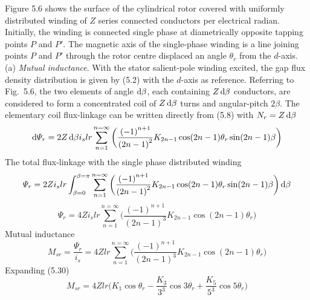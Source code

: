\documentclass[a4paper,numbers=noenddot,12pt]{scrbook}
\begin{document}
Figure 5.6 shows the surface of the cylindrical rotor covered with uniformly distributed winding of $Z$ series connected conductors per electrical radian. Initially, the winding is connected single phase at diametrically opposite tapping points $P$ and $P'$. The magnetic axis of the single-phase winding is a line joining points $P$ and $P'$ through the rotor centre displaced an angle $\theta_r$ from the $d$-axis.
\noindent
(a) \textit{Mutual inductance}. With the stator salient-pole winding excited, the gap flux density distribution is given by (5.2) with the $d$-axis as reference. Referring to Fig.\ 5.6, the two elements of angle $\dif \beta$, each containing $Z \dif \beta$ conductors, are considered to form a concentrated coil of $Z \dif \beta$ turns and angular-pitch $2 \beta$. The elementary coil flux-linkage can be written directly from (5.8) with $N_r = Z \dif \beta$ 
\begin{equation}
    \dif \varPsi_r = 2 Z \dif \beta i_s l r \displaystyle \sum_{n = 1}^{n = \infty}\bigg( \frac{{(-1)}^{n + 1}}{{(2n - 1)}^2} K_{2n - 1} \cos(2n -1)\theta_r \sin(2n - 1) \beta \bigg)
\end{equation}
The total flux-linkage with the single phase distributed winding
\begin{equation}
    \varPsi_r = 2Z i_s l r \int_{\beta = 0}^{\beta=\pi} \displaystyle \sum_{n = 1}^{n = \infty} \bigg( \frac{{(-1)}^{n + 1}}{{(2n - 1)}^2} K_{2n - 1} \cos(2n -1)\theta_r \sin(2n - 1) \beta \bigg)\dif \beta
\end{equation}
\begin{equation}
    \varPsi_r = 4Z i_s l r \displaystyle \sum_{n = 1}^{n = \infty} \bigg( \frac{{(-1)}^{n + 1}}{{(2n - 1)}^3} K_{2n - 1} \cos(2n -1)\theta_r \bigg)
\end{equation}
Mutual inductance
\begin{equation}
    M_{sr} = \frac{\varPsi_r}{i_s} = 4 Z l r \displaystyle \sum_{n = 1}^{n = \infty} \bigg( \frac{{(-1)}^{n + 1}}{{(2n - 1)}^3} K_{2n - 1} \cos(2n -1)\theta_r \bigg)
\end{equation}
Expanding (5.30)
\begin{equation}
    M_{sr} = 4 Z l r \bigg( K_{1} \cos \theta_r -  \frac{K_{3}}{3^3} \cos 3 \theta_r + \frac{K_{5}}{5^3} \cos 5 \theta_r\bigg)
\end{equation}
\end{document}

